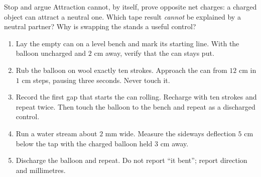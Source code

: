 \begin{telospanel}{Stop and argue}
Attraction cannot, by itself, prove opposite net charges: a charged object can
attract a neutral one. Which tape result \emph{cannot} be explained by a
neutral partner? Why is swapping the stands a useful control?
\end{telospanel}


\begin{enumerate}
\item Lay the empty can on a level bench and mark its starting line. With the
  balloon uncharged and \(2\) cm away, verify that the can stays put.
\item Rub the balloon on wool exactly ten strokes. Approach the can from
  \(12\) cm in \(1\) cm steps, pausing three seconds. Never touch it.
\item Record the first gap that starts the can rolling. Recharge with ten
  strokes and repeat twice. Then touch the balloon to the bench and repeat as a
  discharged control.
\item Run a water stream about \(2\) mm wide. Measure the sideways deflection
  \(5\) cm below the tap with the charged balloon held \(3\) cm away.
\item Discharge the balloon and repeat. Do not report ``it bent''; report
  direction and millimetres.
\end{enumerate}

\begin{center}
\end{center}


